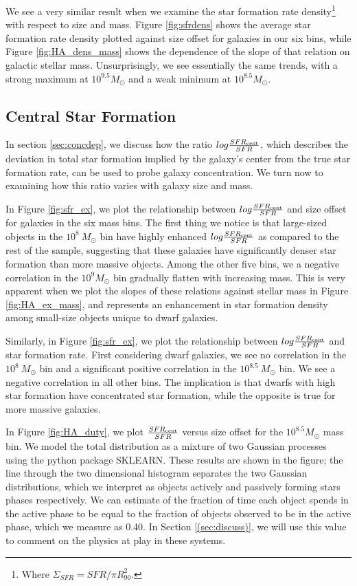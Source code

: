 \documentclass[iop]{emulateapj}
\begin{document}
We see a very similar result when we examine the star formation rate density\footnote{Where $\Sigma_{SFR} = SFR/\pi R_{90}^2$.} with respect to size and mass. Figure \ref{fig:sfrdens} shows the average star formation rate density plotted against size offset for galaxies in our six bins, while Figure \ref{fig:HA_dens_mass} shows the dependence of the slope of that relation on galactic stellar mass. Unsurprisingly, we see essentially the same trends, with a strong maximum at  $10^{9.5} M_{\odot}$ and a weak minimum at $10^{8.5} M_{\odot}$.

\subsection{Central Star Formation}
\label{sec:conc}

In section \ref{sec:concdep}, we discuss how the ratio $log \frac{SFR_{\rm cent}}{SFR}$, which describes the deviation in total star formation implied by the galaxy's center from the true star formation rate, can be used to probe galaxy concentration. We turn now to examining how this ratio varies with galaxy size and mass.

In Figure \ref{fig:sfr_ex}, we plot the relationship between $log \frac{SFR_{\rm cent}}{SFR}$ and size offset for galaxies in the six mass bins. The first thing we notice is that large-sized objects in the $10^{8} \ M_{\odot}$ bin have highly enhanced $log \frac{SFR_{\rm cent}}{SFR}$ as compared to the rest of the sample, suggesting that these galaxies have significantly denser star formation than more massive objects. Among the other five bins, we a negative correlation in the  $10^{9} M_{\odot}$ bin gradually flatten with increasing mass. This is very apparent when we plot the slopes of these relations against stellar mass in Figure \ref{fig:HA_ex_mass}, and represents an enhancement in star formation density among small-size objects unique to dwarf galaxies.

Similarly, in Figure \ref{fig:sfr_ex}, we plot the relationship between $log \frac{SFR_{\rm cent}}{SFR}$ and star formation rate. First considering dwarf galaxies, we see no correlation in the $10^{8} \ M_{\odot}$ bin and a significant positive correlation in the $10^{8.5} \ M_{\odot}$ bin. We see a negative correlation in all other bins. The implication is that dwarfs with high star formation have concentrated star formation, while the opposite is true for more massive galaxies.

In Figure \ref{fig:HA_duty}, we plot $\frac{SFR_{\rm cent}}{SFR}$ versus size offset for the $10^{8.5} M_{\odot}$ mass bin. We model the total distribution as a mixture of two Gaussian processes using the python package SKLEARN. These results are shown in the figure; the line through the two dimensional histogram separates the two Gaussian distributions, which we interpret as objects actively and passively forming stars phases respectively. We can estimate of the fraction of time each object spends in the active phase to be equal to the fraction of objects observed to be in the active phase, which we measure as 0.40. In Section \ref{(sec:discuss)}, we will use this value to comment on the physics at play in these systems.
\end{document}
